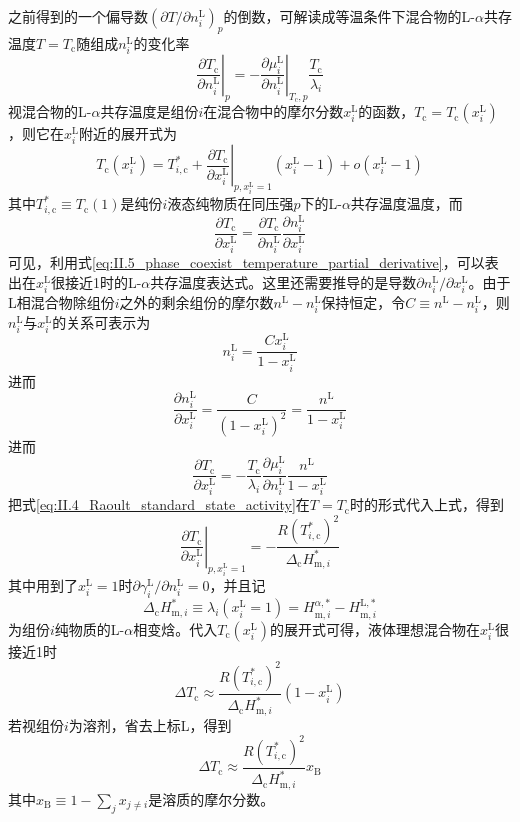 \documentclass[main.tex]{subfiles}
\begin{document}
之前得到的一个偏导数$\left(\partial T/\partial n_i^\text{L}\right)_{p}$的倒数，可解读成等温条件下混合物的L-$\alpha$共存温度$T=T_\text{c}$随组成$n_i^\text{L}$的变化率
\begin{equation}\label{eq:II.5_phase_coexist_temperature_partial_derivative}
  \left.\frac{\partial T_\text{c}}{\partial n_i^\text{L}}\right|_{p}=-\left.\frac{\partial \mu_i^\text{L}}{\partial n_i^\text{L}}\right|_{T_\text{c},p}\frac{T_\text{c}}{\lambda_i}
\end{equation}
视混合物的L-$\alpha$共存温度是组份$i$在混合物中的摩尔分数$x_i^\text{L}$的函数，$T_\text{c}=T_\text{c}\left(x_i^\text{L}\right)$，则它在$x_i^\text{L}$附近的展开式为
\[T_\text{c}\left(x_i^\text{L}\right)=T_{i,\text{c}}^*+\left.\frac{\partial T_\text{c}}{\partial x_i^\text{L}}\right|_{p,x_i^\text{L}=1}\left(x_i^\text{L}-1\right)+o\left(x_i^\text{L}-1\right)\]
其中$T_{i,\text{c}}^*\equiv T_\text{c}\left(1\right)$是纯份$i$液态纯物质在同压强$p$下的L-$\alpha$共存温度温度，而
\[\frac{\partial T_\text{c}}{\partial x_i^\text{L}}=\frac{\partial T_\text{c}}{\partial n_i^\text{L}}\frac{\partial n_i^\text{L}}{\partial x_i^\text{L}}\]
可见，利用式\eqref{eq:II.5_phase_coexist_temperature_partial_derivative}，可以表出在$x_i^\text{L}$很接近1时的L-$\alpha$共存温度表达式。这里还需要推导的是导数$\partial n_i^\text{L}/\partial x_i^\text{L}$。由于L相混合物除组份$i$之外的剩余组份的摩尔数$n^\text{L}-n_i^\text{L}$保持恒定，令$C\equiv n^\text{L}-n_i^\text{L}$，则$n_i^\text{L}$与$x_i^\text{L}$的关系可表示为
\[n_i^\text{L}=\frac{Cx_i^\text{L}}{1-x_i^\text{L}}\]
进而
\[\frac{\partial n_i^\text{L}}{\partial x_i^\text{L}}=\frac{C}{\left(1-x_i^\text{L}\right)^2}=\frac{n^\text{L}}{1-x_i^\text{L}}\]
进而
\[\frac{\partial T_\text{c}}{\partial x_i^\text{L}}=-\frac{T_\text{c}}{\lambda_i}\frac{\partial\mu_i^\text{L}}{\partial n_i^\text{L}}\frac{n^\text{L}}{1-x_i^\text{L}}\]
把式\eqref{eq:II.4_Raoult_standard_state_activity}在$T=T_\text{c}$时的形式代入上式，得到
\[\left.\frac{\partial T_\text{c}}{\partial x_i^\text{L}}\right|_{p,x_i^\text{L}=1}=-\frac{R\left(T_{i,\text{c}}^*\right)^2}{\Delta_\text{c}H_{\text{m},i}^*}\]
其中用到了$x_i^\text{L}=1$时$\partial \gamma_i^\text{L}/\partial n_i^\text{L}=0$，并且记
\[\Delta_\text{c}H_{\text{m},i}^*\equiv\lambda_i\left(x_i^\text{L}=1\right)=H_{\text{m},i}^{\alpha,*}-H_{\text{m},i}^{\text{L},*}\]
为组份$i$纯物质的L-$\alpha$相变焓。代入$T_\text{c}\left(x_i^\text{L}\right)$的展开式可得，液体理想混合物在$x_i^\text{L}$很接近1时
\[\Delta T_\text{c}\approx\frac{R\left(T_{i,\text{c}}^*\right)^2}{\Delta_\text{c}H_{\text{m},i}^*}\left(1-x_i^\text{L}\right)\]
若视组份$i$为溶剂，省去上标L，得到
\[\Delta T_\text{c}\approx \frac{R\left(T_{i,\text{c}}^*\right)^2}{\Delta_\text{c}H_{\text{m},i}^*}x_\text{B}\]
其中$x_\text{B}\equiv 1-\sum_j x_{j\neq i}$是溶质的摩尔分数。
\end{document}
